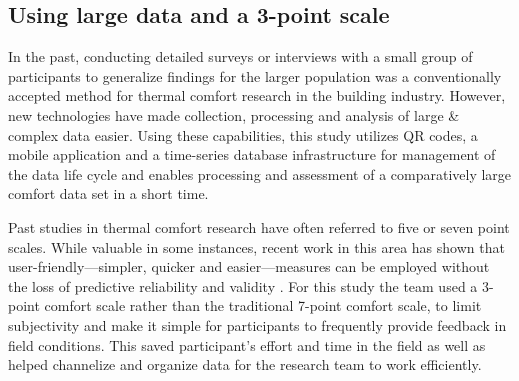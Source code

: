 \documentclass[]{interact}
\theoremstyle{plain}%
\theoremstyle{definition}
\theoremstyle{remark}
\begin{document}

\subsection{Using large data and a 3-point scale}
In the past, conducting detailed surveys or interviews with a small group of participants to generalize findings for the larger population was a conventionally accepted method for thermal comfort research in the building industry. However, new technologies have made collection, processing and analysis of large \& complex data easier. Using these capabilities, this study utilizes QR codes, a mobile application and a time-series database infrastructure for management of the data life cycle and enables processing and assessment of a comparatively large comfort data set in a short time. 


Past studies in thermal comfort research have often referred to five or seven point scales. While valuable in some instances, recent work in this area has shown that user-friendly---simpler, quicker and easier---measures can be employed without the loss of predictive reliability and validity \citep{dolnicar2007user, krosnick2018questionnaire, dolnicar2011three}. For this study the team used a 3-point comfort scale rather than the traditional 7-point comfort scale, to limit subjectivity and make it simple for participants to frequently provide feedback in field conditions. This saved participant's effort and time in the field as well as helped channelize and organize data for the research team to work efficiently. 
\end{document}
